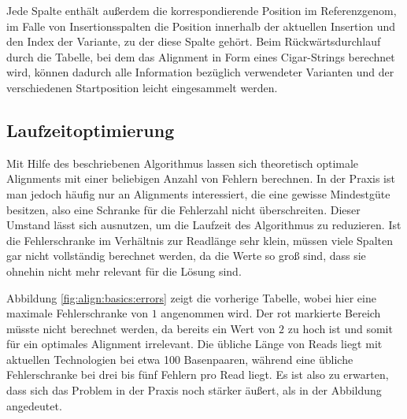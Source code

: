 Jede Spalte enthält außerdem die korrespondierende Position im Referenzgenom, im Falle von Insertionsspalten die Position innerhalb der aktuellen Insertion und den Index der Variante, zu der diese Spalte gehört. Beim Rückwärtsdurchlauf durch die Tabelle, bei dem das Alignment in Form eines Cigar-Strings berechnet wird, können dadurch alle Information bezüglich verwendeter Varianten und der verschiedenen Startposition leicht eingesammelt werden.

\subsection{Laufzeitoptimierung}
\label{sec:align:variants:optimize}

Mit Hilfe des beschriebenen Algorithmus lassen sich theoretisch optimale Alignments mit einer beliebigen Anzahl von Fehlern berechnen. In der Praxis ist man jedoch häufig nur an Alignments interessiert, die eine gewisse Mindestgüte besitzen, also \zB eine Schranke für die Fehlerzahl nicht überschreiten. Dieser Umstand lässt sich ausnutzen, um die Laufzeit des Algorithmus zu reduzieren. Ist die Fehlerschranke im Verhältnis zur Readlänge sehr klein, müssen viele Spalten gar nicht vollständig berechnet werden, da die Werte so groß sind, dass sie ohnehin nicht mehr relevant für die Lösung sind.

Abbildung \ref{fig:align:basics:errors} zeigt die vorherige Tabelle, wobei hier eine maximale Fehlerschranke von $1$ angenommen wird. Der rot markierte Bereich müsste nicht berechnet werden, da bereits ein Wert von $2$ zu hoch ist und somit für ein optimales Alignment irrelevant. Die übliche Länge von Reads liegt mit aktuellen Technologien bei etwa 100 Basenpaaren, während eine übliche Fehlerschranke bei drei bis fünf Fehlern pro Read liegt. Es ist also zu erwarten, dass sich das Problem in der Praxis noch stärker äußert, als in der Abbildung angedeutet.

